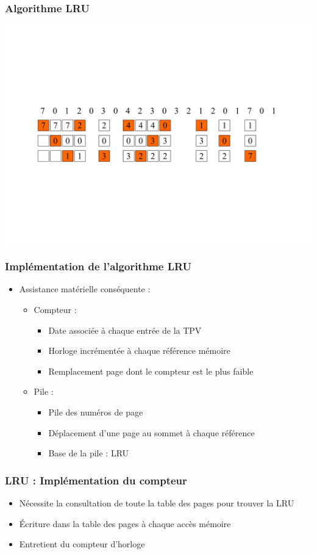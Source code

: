 \begin{frame}
\frametitle{Algorithme LRU}
\includegraphics[width=\textwidth]{../illustration/remplacement_lru.pdf}
\end{frame}


\begin{frame}
\frametitle{Implémentation de l'algorithme LRU}
\begin{itemize}
\item Assistance matérielle conséquente :
\begin{itemize}
\item Compteur :
\begin{itemize}
\item Date associée à chaque entrée de la TPV
\item Horloge incrémentée à chaque référence mémoire
\item Remplacement page dont le compteur est le plus faible
\end{itemize}
\item Pile :
\begin{itemize}
\item Pile des numéros de page
\item Déplacement d'une page au sommet à chaque référence
\item Base de la pile : LRU
\end{itemize}
\end{itemize}
\end{itemize}
\end{frame}


\begin{frame}
\frametitle{LRU : Implémentation du compteur}
\begin{itemize}
\item Nécessite la consultation de toute la table des pages pour trouver la LRU
\item Écriture dans la table des pages à chaque accès mémoire
\item Entretient du compteur d'horloge
\end{itemize}
\end{frame}


